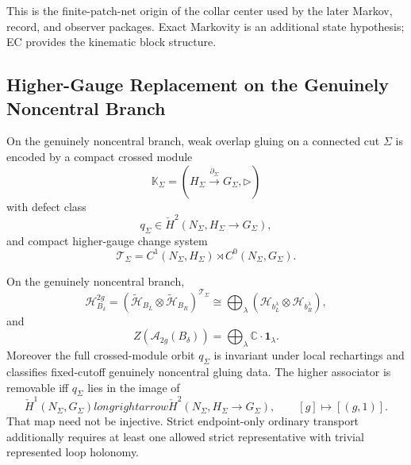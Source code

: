 \begin{remark}
This is the finite-patch-net origin of the collar center used by the later Markov, record, and
observer packages. Exact Markovity is an additional state hypothesis; EC provides the
kinematic block structure.
\end{remark}

\subsection{Higher-Gauge Replacement on the Genuinely Noncentral Branch}

\begin{proposition}
On the genuinely noncentral branch, weak overlap gluing on a connected cut \(\Sigma\) is encoded
by a compact crossed module
\[
\mathbb K_\Sigma=(H_\Sigma\xrightarrow{\partial_\Sigma}G_\Sigma,\triangleright)
\]
with defect class
\[
q_\Sigma\in \check H^2(N_\Sigma,H_\Sigma\to G_\Sigma),
\]
and compact higher-gauge change system
\[
\mathcal T_\Sigma=C^1(N_\Sigma,H_\Sigma)\rtimes C^0(N_\Sigma,G_\Sigma).
\]
\end{proposition}

\begin{theorem}
On the genuinely noncentral branch,
\[
\mathcal H_{B_\delta}^{2g}
=
(\tilde{\mathcal H}_{B_L}\otimes \tilde{\mathcal H}_{B_R})^{\mathcal T_\Sigma}
\cong
\bigoplus_\lambda
(\mathcal H_{b_L^\lambda}\otimes \mathcal H_{b_R^\lambda}),
\]
and
\[
Z(\mathcal A_{2g}(B_\delta))
=
\bigoplus_\lambda \mathbb C\cdot \mathbf 1_\lambda.
\]
Moreover the full crossed-module orbit \(q_\Sigma\) is invariant under local rechartings and
classifies fixed-cutoff genuinely noncentral gluing data. The higher associator is removable iff
\(q_\Sigma\) lies in the image of
\[
\check H^1(N_\Sigma,G_\Sigma)longrightarrow
\check H^2(N_\Sigma,H_\Sigma\to G_\Sigma),
\qquad [g]\longmapsto[(g,1)].
\]
That map need not be injective. Strict endpoint-only ordinary transport additionally requires at
least one allowed strict representative with trivial represented loop holonomy.
\end{theorem}

